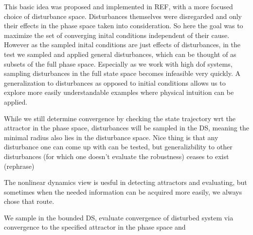     This basic idea was proposed and implemented in REF, with a more focused choice of disturbance space. Disturbances themselves were disregarded and only their effects in the phase space taken into consideration. So here the goal was to maximize the set of converging inital conditions independent of their cause. However as the sampled inital conditions are just effects of disturbances, in the test we sampled and applied general disturbances, which can be thought of as subsets of the full phase space. Especially as we work with high dof systems, sampling disturbances in the full state space becomes infeasible very quickly. A generalization to disturbances as opposed to initial conditions allows us to explore more easily understandable examples where physical intuition can be applied. 


    While we still determine convergence by checking the state trajectory wrt the attractor in the phase space, disturbances will be sampled in the DS, meaning the minimal radius also lies in the disturbance space. Nice thing is that any disturbance one can come up with can be tested, but generalizbility to other disturbances (for which one doesn't evaluate the robustness) ceases to exist (rephrase)

    The nonlinear dynamics view is uesful in detecting attractors and evaluating, but sometimes when the needed information can be acquired more easily, we always chose that route. 



    We sample in the bounded DS, evaluate convergence of disturbed system via convergence to the specified attractor in the phase space and 


    


    
    

